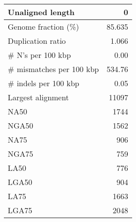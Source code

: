 \documentclass[12pt,a4paper]{article}
\begin{document}
\begin{table}[ht]
\begin{center}
\begin{tabular}{|l*{1}{|r}|}
Unaligned length & 0 \\ \hline
Genome fraction (\%) & 85.635 \\ \hline
Duplication ratio & 1.066 \\ \hline
\# N's per 100 kbp & 0.00 \\ \hline
\# mismatches per 100 kbp & 534.76 \\ \hline
\# indels per 100 kbp & 0.05 \\ \hline
Largest alignment & 11097 \\ \hline
NA50 & 1744 \\ \hline
NGA50 & 1562 \\ \hline
NA75 & 906 \\ \hline
NGA75 & 759 \\ \hline
LA50 & 776 \\ \hline
LGA50 & 904 \\ \hline
LA75 & 1663 \\ \hline
LGA75 & 2048 \\ \hline
\end{tabular}
\end{center}
\end{table}
\end{document}
